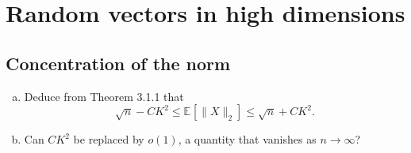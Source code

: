 \chapter{Random vectors in high dimensions}
\section{Concentration of the norm}

\begin{problem*}[Exercise 3.1.4]\label{ex3.1.4}
	\begin{enumerate}[(a)]
		\item\label{ex3.1.4:a} Deduce from Theorem 3.1.1 that
		      \[
			      \sqrt{n} - CK^2
			      \leq \mathbb{E}_{}[\lVert X \rVert _2]
			      \leq \sqrt{n} + CK^2.
		      \]
		\item\label{ex3.1.4:b} Can \(CK^2\) be replaced by \(o(1)\), a quantity that vanishes as \(n \to \infty \)?
	\end{enumerate}
\end{problem*}
